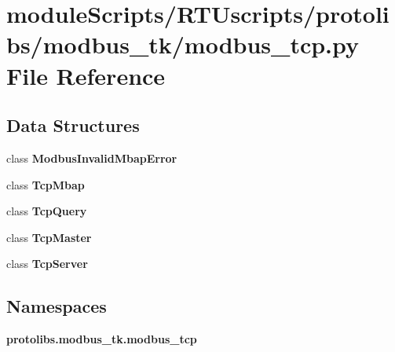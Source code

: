 \section{module\+Scripts/\+R\+T\+Uscripts/protolibs/modbus\+\_\+tk/modbus\+\_\+tcp.py File Reference}
\label{modbus__tk_2modbus__tcp_8py}
\subsection*{Data Structures}
\begin{DoxyCompactItemize}
\item 
class {\bf Modbus\+Invalid\+Mbap\+Error}
\item 
class {\bf Tcp\+Mbap}
\item 
class {\bf Tcp\+Query}
\item 
class {\bf Tcp\+Master}
\item 
class {\bf Tcp\+Server}
\end{DoxyCompactItemize}
\subsection*{Namespaces}
\begin{DoxyCompactItemize}
\item 
 {\bf protolibs.\+modbus\+\_\+tk.\+modbus\+\_\+tcp}
\end{DoxyCompactItemize}
